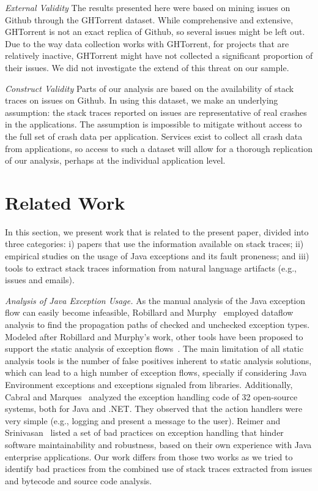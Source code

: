 \documentclass[conference]{IEEEtran}
\begin{document}
\noindent\emph{External Validity} The results presented here were based on mining
issues on Github through the GHTorrent dataset. While comprehensive and
extensive, GHTorrent is not an exact replica of Github, so several issues might
be left out. Due to the way data collection works with GHTorrent, for projects
that are relatively inactive, GHTorrent might have not collected a significant
proportion of their issues. We did not investigate the extend of this threat on
our sample.

\noindent\emph{Construct Validity} Parts of our analysis are based on the availability of stack traces on issues on
Github. In using this dataset, we make an underlying assumption: the
stack traces reported on issues are representative of real crashes in
the applications. The assumption is impossible to mitigate without access to
the full set of crash data per application. Services exist to collect all
crash data from applications, so access to such a dataset will allow for
a thorough replication of our analysis, perhaps at the individual application
level.

\section{Related Work}

In this section, we present work that is related to the present paper, divided into
three categories: i) papers that use the information available on stack traces;
ii) empirical studies on the usage of Java exceptions and its fault proneness;
and iii) tools to extract stack traces information from natural language artifacts
(e.g., issues and emails).

\textit{Analysis of Java Exception Usage.} As the manual analysis of the Java
exception flow can easily become infeasible, Robillard and Murphy~\cite{Robil00}
employed dataflow analysis to find the propagation paths of checked and
unchecked exception types. Modeled after Robillard and Murphy's work, other
tools have been proposed to support the static analysis of exception
flows~\cite{coelho2008assessing}. The main limitation of all
static analysis tools is the number of false positives inherent to static analysis
solutions, which can lead to a high number of exception flows, specially if
considering Java Environment exceptions and exceptions signaled from libraries.
Additionally, Cabral and Marques~\cite{cabral2007exception} analyzed the
exception handling code of 32 open-source systems, both for Java and .NET. They
observed that the action handlers were very simple (e.g., logging and present a
message to the user). Reimer and Srinivasan~\cite{reimer2003analyzing} listed a
set of bad practices on exception handling that hinder software maintainability
and robustness, based on their own experience with Java enterprise applications.
Our work differs from those two works as we tried to identify bad practices from
the combined use of stack traces extracted from issues and bytecode and source
code analysis. 
\end{document}
